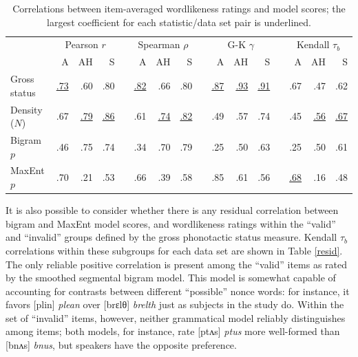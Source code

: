 \begin{table}[ht]
\centering
\begin{tabular}{l rrr c rrr c rrr c rrr}
\toprule
              &         \multicolumn{3}{c}{Pearson $r$} &&     \multicolumn{3}{c}{Spearman $\rho$} && \multicolumn{3}{c}{G-K $\gamma$} && \multicolumn{3}{c}{Kendall $\tau_b$} \\
\cmidrule{2-4} \cmidrule{6-8} \cmidrule{10-12} \cmidrule{14-16}
              &           A &         AH &            S &&           A &       AH    &           S &&           A &          AH &           S &&           A &          AH & S \\
\midrule
Gross status & \uline{.73} &       {.60} &       {.80} && \uline{.82} &       {.66} &       {.80} && \uline{.87} & \uline{.93} & \uline{.91} &&       {.67} &       {.47} &       {.62} \\
Density ($N$) &       {.67} & \uline{.79} & \uline{.86} &&       {.61} & \uline{.74} & \uline{.82} &&       {.49} &       {.57} &       {.74} &&       {.45} & \uline{.56} & \uline{.67} \\
Bigram $p$ &       {.46} &       {.75} &       {.74} &&       {.34} &       {.70} &       {.79} &&       {.25} &       {.50} &       {.63} &&       {.25} &       {.50} &       {.61} \\
MaxEnt $p$ &       {.70} &       {.21} &       {.53} &&       {.66} &       {.39} &       {.58} &&       {.85} &       {.61} &       {.56} && \uline{.68} &       {.16} &       {.48} \\ 
\bottomrule
\end{tabular}
\caption{Correlations between item-averaged wordlikeness ratings and model scores; the largest coefficient for each statistic/data set pair is underlined.}
\label{scores}
\end{table}

It is also possible to consider whether there is any residual correlation between bigram and MaxEnt model scores, and wordlikeness ratings within the ``valid'' and ``invalid'' groups defined by the gross phonotactic status measure. Kendall $\tau_{b}$ correlations within these subgroups for each data set are shown in Table \ref{resid}. The only reliable positive correlation is present among the ``valid'' items as rated by the smoothed segmental bigram model. This model is somewhat capable of accounting for contrasts between different ``possible'' nonce words: for instance, it favors [plin] \emph{plean} over [brɛlθ] \emph{brelth} just as subjects in the \citet{Albright2007} study do. Within the set of ``invalid'' items, however, neither grammatical model reliably distinguishes among items; both models, for instance, rate [ptʌs] \emph{ptus} more well-formed than [bnʌs] \emph{bnus}, but speakers have the opposite preference. 

